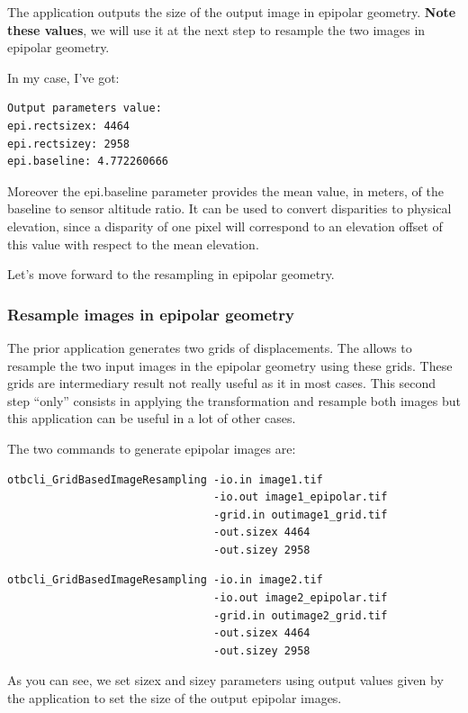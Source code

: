 The application outputs the size of the output image in epipolar
geometry. \textbf{Note these values}, we will use it at the next step to
resample the two images in epipolar geometry.

In my case, I've got:

\begin{verbatim}
Output parameters value:
epi.rectsizex: 4464
epi.rectsizey: 2958
epi.baseline: 4.772260666
\end{verbatim}

Moreover the epi.baseline parameter provides the mean value, in meters, of the
baseline to sensor altitude ratio. It can be used to convert disparities to
physical elevation, since a disparity of one pixel will correspond to an
elevation offset of this value with respect to the mean elevation.

Let's move forward to the resampling in epipolar geometry.

\subsubsection{Resample images in epipolar geometry}

The prior application generates two grids of displacements. The
 allows to resample the two input images
in the epipolar geometry using these grids.  These grids are intermediary result
not really useful as it in most cases. This second step ``only'' consists in
applying the transformation and resample both images but this application can be
useful in a lot of other cases.

The two commands to generate epipolar images are:
\begin{verbatim}
otbcli_GridBasedImageResampling -io.in image1.tif
                                -io.out image1_epipolar.tif
                                -grid.in outimage1_grid.tif
                                -out.sizex 4464
                                -out.sizey 2958
\end{verbatim}

\begin{verbatim}
otbcli_GridBasedImageResampling -io.in image2.tif
                                -io.out image2_epipolar.tif
                                -grid.in outimage2_grid.tif
                                -out.sizex 4464
                                -out.sizey 2958
\end{verbatim}

As you can see, we set sizex and sizey parameters using output values given by
the  application to set the size
of the output epipolar images.

